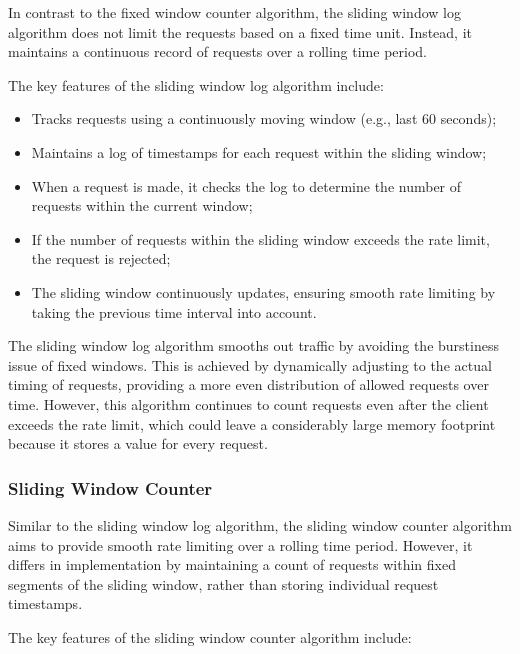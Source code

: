 In contrast to the fixed window counter algorithm, the sliding window log algorithm does not limit the requests based on a fixed time unit.
Instead, it maintains a continuous record of requests over a rolling time period.

The key features of the sliding window log algorithm include:

\begin{itemize}
    \item Tracks requests using a continuously moving window (e.g., last 60 seconds);
    \item Maintains a log of timestamps for each request within the sliding window;
    \item When a request is made, it checks the log to determine the number of requests within the current window;
    \item If the number of requests within the sliding window exceeds the rate limit, the request is rejected;
    \item The sliding window continuously updates, ensuring smooth rate limiting by taking the previous time interval into account.
\end{itemize}

The sliding window log algorithm smooths out traffic by avoiding the burstiness issue of fixed windows.
This is achieved by dynamically adjusting to the actual timing of requests, providing a more even distribution of allowed requests over time.
However, this algorithm continues to count requests even after the client exceeds the rate limit, which could leave a considerably large memory footprint because it stores a value for every request.

\subsubsection{Sliding Window Counter}\label{subsubsec:sliding-window-counter-algorithm}

Similar to the sliding window log algorithm, the sliding window counter algorithm aims to provide smooth rate limiting over a rolling time period.
However, it differs in implementation by maintaining a count of requests within fixed segments of the sliding window, rather than storing individual request timestamps.

The key features of the sliding window counter algorithm include:


